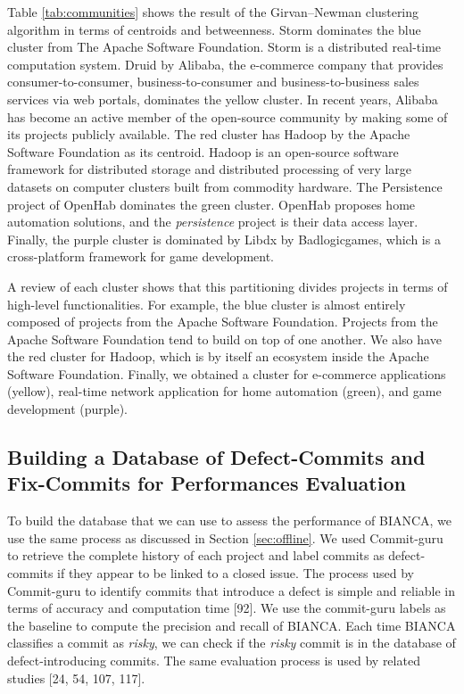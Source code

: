 \documentclass[12pt]{report}
\begin{document}
Table \ref{tab:communities} shows the result of the Girvan--Newman
clustering algorithm in terms of centroids and betweenness. Storm
dominates the blue cluster from The Apache Software Foundation. Storm is
a distributed real-time computation system. Druid by Alibaba, the
e-commerce company that provides consumer-to-consumer,
business-to-consumer and business-to-business sales services via web
portals, dominates the yellow cluster. In recent years, Alibaba has
become an active member of the open-source community by making some of
its projects publicly available. The red cluster has Hadoop by the
Apache Software Foundation as its centroid. Hadoop is an open-source
software framework for distributed storage and distributed processing of
very large datasets on computer clusters built from commodity hardware.
The Persistence project of OpenHab dominates the green cluster. OpenHab
proposes home automation solutions, and the \emph{persistence} project
is their data access layer. Finally, the purple cluster is dominated by
Libdx by Badlogicgames, which is a cross-platform framework for game
development.

A review of each cluster shows that this partitioning divides projects
in terms of high-level functionalities. For example, the blue cluster is
almost entirely composed of projects from the Apache Software
Foundation. Projects from the Apache Software Foundation tend to build
on top of one another. We also have the red cluster for Hadoop, which is
by itself an ecosystem inside the Apache Software Foundation. Finally,
we obtained a cluster for e-commerce applications (yellow), real-time
network application for home automation (green), and game development
(purple).



\subsection{Building a Database of Defect-Commits and Fix-Commits for
Performances Evaluation}\label{sub:golden}

To build the database that we can use to assess the performance of
BIANCA, we use the same process as discussed in Section
\ref{sec:offline}. We used Commit-guru to retrieve the complete history
of each project and label commits as defect-commits if they appear to be
linked to a closed issue. The process used by Commit-guru to identify
commits that introduce a defect is simple and reliable in terms of
accuracy and computation time {[}92{]}. We use the commit-guru labels as
the baseline to compute the precision and recall of BIANCA. Each time
BIANCA classifies a commit as \emph{risky}, we can check if the
\emph{risky} commit is in the database of defect-introducing commits.
The same evaluation process is used by related studies {[}24, 54, 107,
117{]}.
\end{document}

